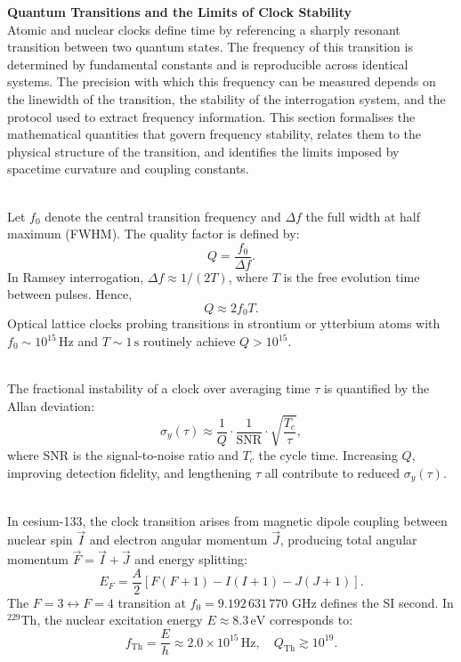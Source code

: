\begin{technical}
{\Large\textbf{Quantum Transitions and the Limits of Clock Stability}}\\[0.3em]
Atomic and nuclear clocks define time by referencing a sharply resonant transition between two quantum states. The frequency of this transition is determined by fundamental constants and is reproducible across identical systems. The precision with which this frequency can be measured depends on the linewidth of the transition, the stability of the interrogation system, and the protocol used to extract frequency information. This section formalises the mathematical quantities that govern frequency stability, relates them to the physical structure of the transition, and identifies the limits imposed by spacetime curvature and coupling constants.

\\[0.5em]
Let $f_0$ denote the central transition frequency and $\Delta f$ the full width at half maximum (FWHM). The quality factor is defined by:
\[
Q = \frac{f_0}{\Delta f}.
\]
In Ramsey interrogation, $\Delta f \approx 1/(2T)$, where $T$ is the free evolution time between pulses. Hence,
\[
Q \approx 2 f_0 T.
\]
Optical lattice clocks probing transitions in strontium or ytterbium atoms with $f_0 \sim 10^{15}\,\mathrm{Hz}$ and $T \sim 1\,\mathrm{s}$ routinely achieve $Q > 10^{15}$.

\\[0.5em]
The fractional instability of a clock over averaging time $\tau$ is quantified by the Allan deviation:
\[
\sigma_y(\tau) \approx \frac{1}{Q} \cdot \frac{1}{\mathrm{SNR}} \cdot \sqrt{\frac{T_c}{\tau}},
\]
where $\mathrm{SNR}$ is the signal-to-noise ratio and $T_c$ the cycle time. Increasing $Q$, improving detection fidelity, and lengthening $\tau$ all contribute to reduced $\sigma_y(\tau)$.

\\[0.5em]
In cesium-133, the clock transition arises from magnetic dipole coupling between nuclear spin $\vec{I}$ and electron angular momentum $\vec{J}$, producing total angular momentum $\vec{F} = \vec{I} + \vec{J}$ and energy splitting:
\[
E_F = \frac{A}{2} \left[ F(F+1) - I(I+1) - J(J+1) \right].
\]
The $F=3 \leftrightarrow F=4$ transition at $f_0 = 9.192\,631\,770$ GHz defines the SI second. In $^{229}$Th, the nuclear excitation energy $E \approx 8.3\,\mathrm{eV}$ corresponds to:
\[
f_{\mathrm{Th}} = \frac{E}{h} \approx 2.0 \times 10^{15}\,\mathrm{Hz}, \quad Q_{\mathrm{Th}} \gtrsim 10^{19}.
\]


\end{technical}
